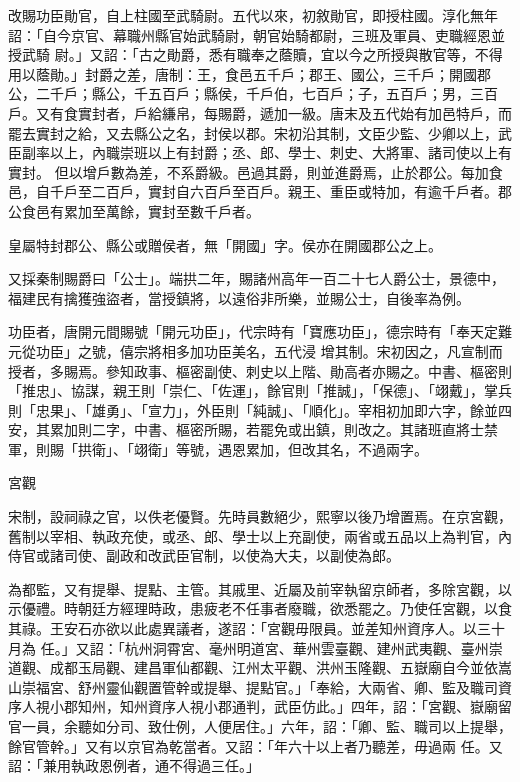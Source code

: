 \begin{pinyinscope}
 改賜功臣勛官，自上柱國至武騎尉。五代以來，初敘勛官，即授柱國。淳化無年詔：「自今京官、幕職州縣官始武騎尉，朝官始騎都尉，三班及軍員、吏職經恩並授武騎
 尉。」又詔：「古之勛爵，悉有職奉之蔭贖，宜以今之所授與散官等，不得用以蔭勛。」封爵之差，唐制：王，食邑五千戶；郡王、國公，三千戶；開國郡公，二千戶；縣公，千五百戶；縣侯，千戶伯，七百戶；子，五百戶；男，三百戶。又有食實封者，戶給縑帛，每賜爵，遞加一級。唐末及五代始有加邑特戶，而罷去實封之給，又去縣公之名，封侯以郡。宋初沿其制，文臣少監、少卿以上，武臣副率以上，內職崇班以上有封爵；丞、郎、學士、刺史、大將軍、諸司使以上有實封。
 但以增戶數為差，不系爵級。邑過其爵，則並進爵焉，止於郡公。每加食邑，自千戶至二百戶，實封自六百戶至百戶。親王、重臣或特加，有逾千戶者。郡公食邑有累加至萬餘，實封至數千戶者。



 皇屬特封郡公、縣公或贈侯者，無「開國」字。侯亦在開國郡公之上。



 又採秦制賜爵曰「公士」。端拱二年，賜諸州高年一百二十七人爵公士，景德中，福建民有擒獲強盜者，當授鎮將，以遠俗非所樂，並賜公士，自後率為例。



 功臣者，唐開元間賜號「開元功臣」，代宗時有「寶應功臣」，德宗時有「奉天定難元從功臣」之號，僖宗將相多加功臣美名，五代浸
 增其制。宋初因之，凡宣制而授者，多賜焉。參知政事、樞密副使、刺史以上階、勛高者亦賜之。中書、樞密則「推忠」、協謀，親王則「崇仁、「佐運」，餘官則「推誠」，「保德」、「翊戴」，掌兵則「忠果」、「雄勇」、「宣力」，外臣則「純誠」、「順化」。宰相初加即六字，餘並四安，其累加則二字，中書、樞密所賜，若罷免或出鎮，則改之。其諸班直將士禁軍，則賜「拱衛」、「翊衛」等號，遇恩累加，但改其名，不過兩字。



 宮觀



 宋制，設祠祿之官，以佚老優賢。先時員數絕少，熙寧以後乃增置焉。在京宮觀，舊制以宰相、執政充使，或丞、郎、學士以上充副使，兩省或五品以上為判官，內侍官或諸司使、副政和改武臣官制，以使為大夫，以副使為郎。



 為都監，又有提舉、提點、主管。其戚里、近屬及前宰執留京師者，多除宮觀，以示優禮。時朝廷方經理時政，患疲老不任事者廢職，欲悉罷之。乃使任宮觀，以食其祿。王安石亦欲以此處異議者，遂詔：「宮觀毋限員。並差知州資序人。以三十月為
 任。」又詔：「杭州洞霄宮、毫州明道宮、華州雲臺觀、建州武夷觀、臺州崇道觀、成都玉局觀、建昌軍仙都觀、江州太平觀、洪州玉隆觀、五嶽廟自今並依嵩山崇福宮、舒州靈仙觀置管幹或提舉、提點官。」「奉給，大兩省、卿、監及職司資序人視小郡知州，知州資序人視小郡通判，武臣仿此。」四年，詔：「宮觀、嶽廟留官一員，余聽如分司、致仕例，人便居住。」六年，詔：「卿、監、職司以上提舉，餘官管幹。」又有以京官為乾當者。又詔：「年六十以上者乃聽差，毋過兩
 任。又詔：「兼用執政恩例者，通不得過三任。」




\end{pinyinscope}

